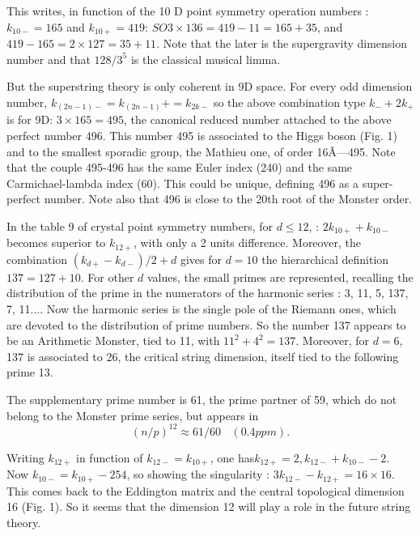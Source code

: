 \documentclass[a4paper,9pt]{article}
\begin{document}
     
     This writes, in function of the 10 D point symmetry operation numbers :  $k_{10-} = 165$ and $k_{10+} = 419$: $SO3 \times 136 = 419 - 11 = 165 + 35$, and $419-165 = 2 \times 127 =  35 + 11$. Note that the later is the supergravity dimension number and that $128/3^5$ is the classical musical limma. 
     
     
     But the superstring theory is only coherent in 9D space. For every odd dimension number, $k_{(2n - 1)-} = k_(2n - 1)+ = k_{2k-}$ so the above combination type $k_- + 2k_+$ is for 9D: $3 \times 165 = 495$, the canonical reduced number attached to the above perfect number 496. This number 495 is associated to the Higgs boson (Fig. 1) and to the smallest sporadic group, the Mathieu one, of order 16Ã—495. Note that the couple 495-496 has the same Euler index (240) and the same Carmichael-lambda index (60). This could be unique, defining 496 as a super-perfect number. Note also that 496 is close to the 20th root of the Monster order.
     
     
     In the table 9 of crystal point symmetry numbers, for $d \le 12$, : $2k_{10+} +  k_{10-}$ becomes superior to $k_{12+}$, with only a 2 units difference. Moreover, the combination $(k_{d+} -  k_{d-})/2 + d$ gives for $d = 10$ the hierarchical definition $  137 = 127 + 10$. For other $d$ values, the small primes are represented, recalling the distribution of the prime in the numerators of the harmonic series : 3, 11, 5, 137, 7, 11.... Now the harmonic series is the single pole of the Riemann ones, which are devoted to the distribution of prime numbers. So the number 137 appears to be an Arithmetic Monster, tied to 11, with $11^2 +  4^2 = 137$. Moreover, for $d = 6$, 137 is associated to 26, the critical string dimension, itself tied to the following prime 13.
  
    The supplementary prime number is 61, the prime partner of 59, which do not belong to the Monster prime series, but appears in
    \begin{equation}
    (n/p)^{12} \approx 61/60~~~~   (0.4 ppm).    
    \end{equation}
    
    
    Writing $k_{12+}$ in function of $k_{12-} = k_{10+}$, one has$ k_{12+} = 2,  k_{12-} + k_{10-} - 2$. Now   $k_{10-} = k_{10+} - 254$, so showing the singularity : $3k_{12-} - k_{12+}  = 16 \times 16$. This comes back to the Eddington matrix and the central topological dimension 16 (Fig. 1). So it seems that the dimension 12 will play a role in the future string theory.
    
\end{document}
